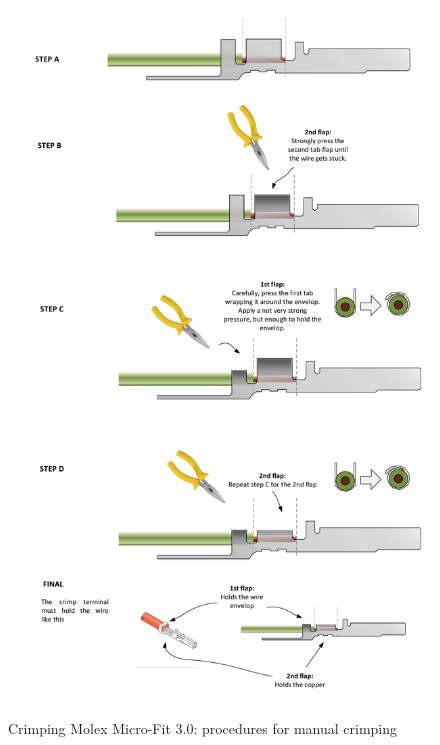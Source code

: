 \begin{figure}
  \centering
  \includegraphics[angle=90,width=1\columnwidth]{figs/body03/FIGCRIMP2.pdf}\\
  \caption[Crimping Molex Micro-Fit 3.0\texttrademark: procedures for manual crimping]{Crimping Molex Micro-Fit 3.0\texttrademark: procedures for manual crimping}
  \label{FIG:CRIMP2}
\end{figure}
